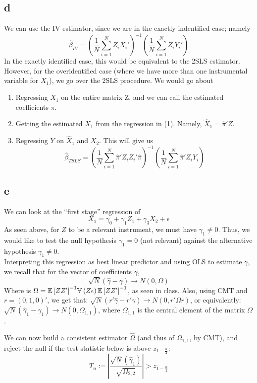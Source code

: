 \documentclass[12pt]{paper}
\begin{document}
\subsection*{d} We can use the IV estimator, since we are in the exactly indentified case; namely 
$$\hat \beta_{IV} = (\frac{1}{N} \sum_{i=1}^N Z_iX_i')^{-1} (\frac{1}{N}\sum_{i=1}^N Z_iY_i')$$
In the exactly identified case, this would be equivalent to the 2SLS estimator. However, for the overidentified case (where we have more than one instrumental variable for $X_1$), we go over the 2SLS procedure. We would go about 
\begin{enumerate}
    \item Regressing $X_1$ on the entire matrix Z, and we can call the estimated coefficients $\pi$.
    \item Getting the estimated $X_1$ from the regression in (1). Namely, $\hat X_1 = \hat \pi' Z$.
    \item Regressing $Y$ on $\hat X_1$ and $X_2$. This will give us
$$\hat \beta_{TSLS} = (\frac{1}{N} \sum_{i=1}^N \hat \pi' Z_i Z_i'\hat \pi)^{-1} (\frac{1}{N}\sum_{i=1}^N \hat \pi' Z_i Y_i)$$
\end{enumerate}

\subsection*{e} We can look at the ``first stage'' regression of $$X_1 = \gamma_0 + \gamma_1 Z_1 + \gamma_3 X_2 + \epsilon$$
As seen above, for $Z$ to be a relevant instrument, we must have $\gamma_1\ne0$. Thus, we would like to test the null hypothesis $\gamma_1 = 0$ (not relevant) against the alternative hypothesis $\gamma_1 \neq 0$. \\
Interpreting this regression as best linear predictor and using OLS to estimate $\gamma$, we recall that for the vector of coefficients $\gamma$, $$\sqrt{N}(\hat \gamma - \gamma) \rightarrow N(0,\Omega)$$
Where is $\Omega={\mathbb{E} \left [ ZZ' \right ]}^{-1}\mathbb{V} \left ( Z\epsilon \right ){\mathbb{E} \left [ ZZ' \right ]}^{-1}$, as seen in class. Also, using CMT and $r=(0,1,0)'$, we get that: $\sqrt{N}(r' \hat{\gamma} - r'\gamma) \rightarrow N(0,r'\Omega r)$, or equivalently:  $\sqrt{N}(\hat{\gamma}_1 -\gamma_1) \rightarrow N(0,\Omega_{1,1})$, where $\Omega_{1,1}$ is the central element of the matrix $\Omega$.

We can now build a consistent estimator $\hat \Omega$ (and thus of $\Omega_{1,1}$, by CMT), and reject the null if the test statistic below is above $z_{1-\frac{\alpha}{2}}$:
$$T_n:=|\frac{\sqrt{N}(\hat \gamma_1)}{\sqrt{\Omega_{2,2}}}| > z_{1-\frac{\alpha}{2}}$$
\end{document}
